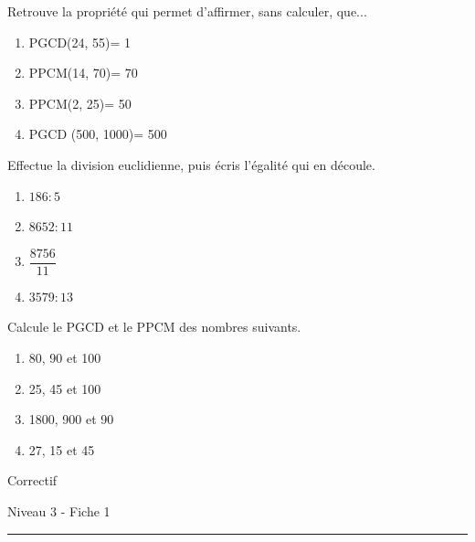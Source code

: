 \documentclass[12pt,parskip=half-, twoside=semi]{scrartcl}
\begin{document}
\setcounter{exercise}{0}
      
\begin{exercise}
  Retrouve la propriété qui permet d'affirmer, sans calculer, que... 
  \begin{enumerate}[cols=2]
    \item PGCD(24, 55)= 1
    \item PPCM(14, 70)= 70
    \item PPCM(2, 25)= 50
    \item PGCD (500, 1000)= 500
  \end{enumerate}
\end{exercise}

\begin{exercise}
  Effectue la division euclidienne, puis écris l'égalité qui en découle. 
    \begin{enumerate}[cols=2]
      \item \(186 : 5\)
      \item \(8652 : 11\)
      \item \(\dfrac{8756}{11}\)
      \item \(3579 : 13\)
    \end{enumerate}
\end{exercise}

\begin{exercise}
  Calcule le PGCD et le PPCM des nombres suivants. 
    \begin{enumerate}[cols=2]
      \item 80, 90 et 100
      \item 25, 45 et 100
      \item 1800, 900 et 90
      \item 27, 15 et 45
    \end{enumerate}
\end{exercise}

\newpage

\begin{center}
  \bfseries
  \begin{Huge}
    Correctif
  \end{Huge}
  \smallbreak
  \begin{large}
    Niveau 3    - Fiche 1
  \end{large}
  \smallbreak
  \rule[10pt]{.5\linewidth}{1 pt}
\end{center}

\setcounter{exercise}{0}
      
\end{document}
